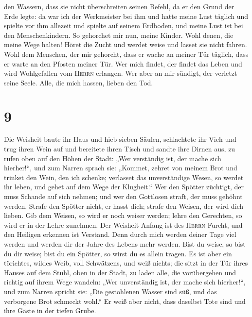 den Wassern, dass sie nicht überschreiten seinen Befehl, da er den Grund
der Erde legte:  da war ich der Werkmeister bei ihm und
hatte meine Lust täglich und spielte vor ihm allezeit 
und spielte auf seinem Erdboden, und meine Lust ist bei den
Menschenkindern.  So gehorchet mir nun, meine Kinder.
Wohl denen, die meine Wege halten!  Höret die Zucht und
werdet weise und lasset sie nicht fahren.  Wohl dem
Menschen, der mir gehorcht, dass er wache an meiner Tür täglich, dass er
warte an den Pfosten meiner Tür.  Wer mich findet, der
findet das Leben und wird Wohlgefallen vom \textsc{Herrn} erlangen.
 Wer aber an mir sündigt, der verletzt seine Seele. Alle,
die mich hassen, lieben den Tod.

\hypertarget{section-8}{%
\section{9}\label{section-8}}

 Die Weisheit baute ihr Haus und hieb sieben Säulen,
 schlachtete ihr Vieh und trug ihren Wein auf und
bereitete ihren Tisch  und sandte ihre Dirnen aus, zu
rufen oben auf den Höhen der Stadt:  „Wer verständig ist,
der mache sich hierher!{}``, und zum Narren sprach sie: 
„Kommet, zehret von meinem Brot und trinket den Wein, den ich schenke;
 verlasset das unverständige Wesen, so werdet ihr leben,
und gehet auf dem Wege der Klugheit.``  Wer den Spötter
züchtigt, der muss Schande auf sich nehmen; und wer den Gottlosen
straft, der muss gehöhnt werden.  Strafe den Spötter
nicht, er hasst dich; strafe den Weisen, der wird dich lieben.
 Gib dem Weisen, so wird er noch weiser werden; lehre den
Gerechten, so wird er in der Lehre zunehmen.  Der
Weisheit Anfang ist des \textsc{Herrn} Furcht, und den Heiligen erkennen
ist Verstand.  Denn durch mich werden deiner Tage viel
werden und werden dir der Jahre des Lebens mehr werden. 
Bist du weise, so bist du dir weise; bist du ein Spötter, so wirst du es
allein tragen.  Es ist aber ein törichtes, wildes Weib,
voll Schwätzens, und weiß nichts;  die sitzt in der Tür
ihres Hauses auf dem Stuhl, oben in der Stadt,  zu laden
alle, die vorübergehen und richtig auf ihrem Wege wandeln:
 „Wer unverständig ist, der mache sich hierher!{}``, und
zum Narren spricht sie:  „Die gestohlenen Wasser sind
süß, und das verborgene Brot schmeckt wohl.``  Er weiß
aber nicht, dass daselbst Tote sind und ihre Gäste in der tiefen Grube.

